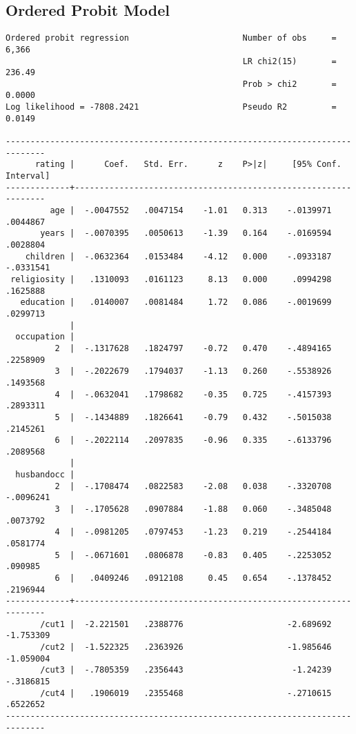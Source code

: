\documentclass{article}
\begin{document}
\newpage
\hypertarget{oprobit}{\subsection*{Ordered Probit Model}}
\begin{verbatim}
Ordered probit regression                       Number of obs     =      6,366
                                                LR chi2(15)       =     236.49
                                                Prob > chi2       =     0.0000
Log likelihood = -7808.2421                     Pseudo R2         =     0.0149

------------------------------------------------------------------------------
      rating |      Coef.   Std. Err.      z    P>|z|     [95% Conf. Interval]
-------------+----------------------------------------------------------------
         age |  -.0047552   .0047154    -1.01   0.313    -.0139971    .0044867
       years |  -.0070395   .0050613    -1.39   0.164    -.0169594    .0028804
    children |  -.0632364   .0153484    -4.12   0.000    -.0933187   -.0331541
 religiosity |   .1310093   .0161123     8.13   0.000     .0994298    .1625888
   education |   .0140007   .0081484     1.72   0.086    -.0019699    .0299713
             |
  occupation |
          2  |  -.1317628   .1824797    -0.72   0.470    -.4894165    .2258909
          3  |  -.2022679   .1794037    -1.13   0.260    -.5538926    .1493568
          4  |  -.0632041   .1798682    -0.35   0.725    -.4157393    .2893311
          5  |  -.1434889   .1826641    -0.79   0.432    -.5015038    .2145261
          6  |  -.2022114   .2097835    -0.96   0.335    -.6133796    .2089568
             |
  husbandocc |
          2  |  -.1708474   .0822583    -2.08   0.038    -.3320708   -.0096241
          3  |  -.1705628   .0907884    -1.88   0.060    -.3485048    .0073792
          4  |  -.0981205   .0797453    -1.23   0.219    -.2544184    .0581774
          5  |  -.0671601   .0806878    -0.83   0.405    -.2253052     .090985
          6  |   .0409246   .0912108     0.45   0.654    -.1378452    .2196944
-------------+----------------------------------------------------------------
       /cut1 |  -2.221501   .2388776                     -2.689692   -1.753309
       /cut2 |  -1.522325   .2363926                     -1.985646   -1.059004
       /cut3 |  -.7805359   .2356443                      -1.24239   -.3186815
       /cut4 |   .1906019   .2355468                     -.2710615    .6522652
------------------------------------------------------------------------------
\end{verbatim}
\end{document}
